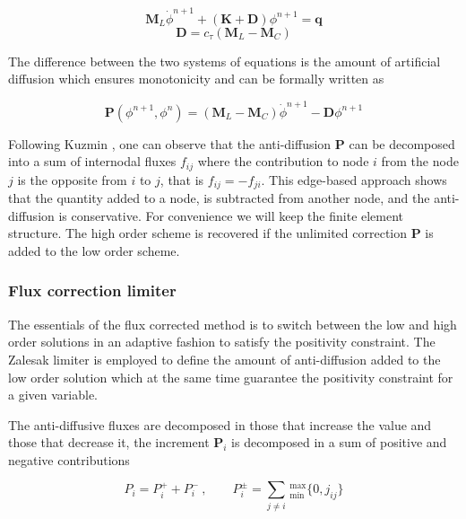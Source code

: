 \begin{equation} \label{lo}
\mathbf{M}_L\dot{\phi}^{n+1} + \left(\mathbf{K+D}\right)\phi^{n+1} = \mathbf{q}
\end{equation}
\begin{equation} \label{scalar_diffusion}
\mathbf{D} = c_\tau\left(\mathbf{M}_L - \mathbf{M}_C\right)
\end{equation}

The difference between the two systems of equations is the amount of artificial diffusion which ensures monotonicity and can be formally written as

\begin{equation}
\mathbf{P}(\phi^{n+1}, \phi^n) = (\mathbf{M}_L - \mathbf{M}_C)\dot{\phi}^{n+1} - \mathbf{D} \phi^{n+1}
\end{equation}

Following Kuzmin \cite{kuzmin2005a}, one can observe that the anti-diffusion $\mathbf{P}$ can be decomposed into a sum of internodal fluxes $f_{ij}$ where the contribution to node $i$ from the node $j$ is the opposite from $i$ to $j$, that is $f_{ij}=-f_{ji}$. This edge-based approach shows that the quantity added to a node, is subtracted from another node, and the anti-diffusion is conservative. For convenience we will keep the finite element structure. The high order scheme is recovered if the unlimited correction $\mathbf{P}$ is added to the low order scheme.



\subsubsection{Flux correction limiter}

The essentials of the flux corrected method is to switch between the low and high order solutions in an adaptive fashion to satisfy the positivity constraint. The Zalesak limiter is employed to define the amount of anti-diffusion added to the low order solution which at the same time guarantee the positivity constraint for a given variable.

The anti-diffusive fluxes are decomposed in those that increase the value and those that decrease it, the increment $\mathbf{P}_i$ is decomposed in a sum of positive and negative contributions

\begin{equation}
P_i = P_i^+ + P_i^- \ , \qquad
P_i^{\pm} = \sum_{j\neq i} \,
_{\min}^{\max} \{0, j_{ij}\}
\end{equation}

